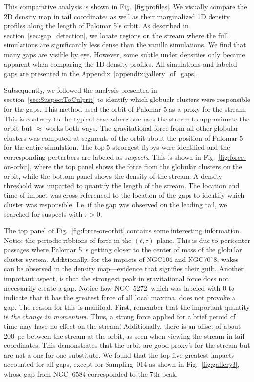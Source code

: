 \documentclass[draft]{aa}
\begin{document}
  This comparative analysis is shown in Fig.~\ref{fig:profiles}. We visually compare the 2D density map in tail coordinates as well as their marginalized 1D density profiles along the length of Palomar 5's orbit. As described in section~\ref{sec:gap_detection}, we locate regions on the stream where the full simulations are significantly less dense than the vanilla simulations. We find that many gaps are visible by eye. However, some subtle under densities only became apparent when comparing the 1D density profiles. All simulations and labeled gaps are presented in the Appendix~\ref{appendix:gallery_of_gaps}.

  Subsequently, we followed the analysis presented in section~\ref{sec:SuspectToCulprit} to identify which globualr clusters were responsible for the gaps. This method used the orbit of Palomar 5 as a proxy for the stream. This is contrary to the typical case where one uses the stream to approximate the orbit--but $\approx$ works both ways. The gravitational force from all other globular clusters was computed at segments of the orbit about the position of Palomar 5 for the entire simulation. The top 5 strongest flybys were identified and the corresponding perturbers are labeled as \textit{suspects}. This is shown in Fig.~\ref{fig:force-on-orbit}, where the top panel shows the force from the globular clusters on the orbit, while the bottom panel shows the density of the stream. A density threshold was imparted to quantify the length of the stream. The location and time of impact was cross referenced to the location of the gaps to identify which cluster was responsible. I.e. if the gap was observed on the leading tail, we searched for suspects with $\tau>0$.
  
  The top panel of Fig.~\ref{fig:force-on-orbit} contains some interesting information. Notice the periodic ribbions of force in the $(t,\tau)$ plane. This is due to pericenter passages where Palomar 5 is getting closer to the center of mass of the globular cluster system. Additionally, for the impacts of NGC104 and NGC7078, wakes can be observed in the density map---evidence that signifies their guilt. Another important aspect, is that the strongest peak in gravitational force does not necessarily create a gap. Notice how NGC~5272, which was labeled with 0 to indicate that it has the greatest force of all local maxima, does not provoke a gap. The reason for this is manifold. First, remember that the important quantity is \textit{the change in momentum}. Thus, a strong force applied for a brief peroid of time may have no effect on the stream!  Additionally, there is an offset of about 200~pc between the stream at the orbit, as seen when viewing the stream in tail coordinates. This demonstrates that the orbit are good proxy's for the stream but are not a one for one substitute. We found that the top five greatest impacts accounted for all gaps, except for Sampling~014 as shown in Fig.~\ref{fig:gallery3}, whose gap from NGC~6584 corresponded to the 7th peak. 
\end{document}
